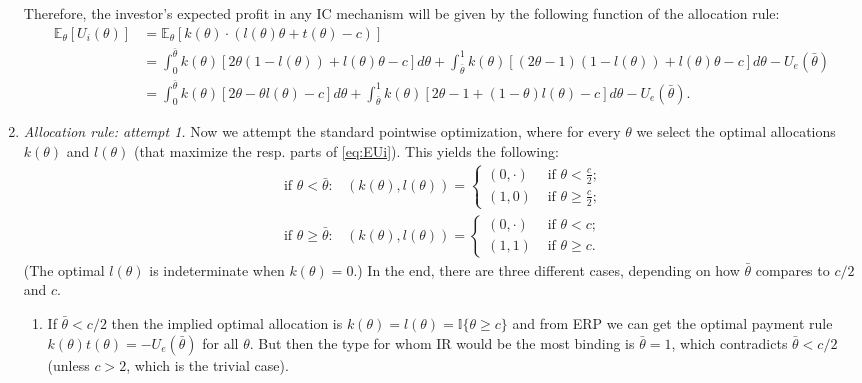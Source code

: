\documentclass[a4paper]{article}
\begin{document}
\begin{enumerate}
		Therefore, the investor's expected profit in any IC mechanism will be given by the following function of the allocation rule:
		\begin{align}
			\mathbb{E}_\theta[U_i(\theta)] &= \mathbb{E}_\theta \left[ k(\theta) \cdot (l(\theta) \theta + t(\theta) - c) \right] 
			\nonumber
			\\
			&= \int_0^{\bar{\theta}} k(\theta) \left[ 2\theta(1-l(\theta)) + l(\theta) \theta - c  \right] d\theta + \int_{\bar{\theta}}^1 k(\theta) \left[ (2\theta-1)(1-l(\theta)) + l(\theta) \theta - c  \right] d\theta - U_e(\bar{\theta})
			\nonumber
			\\
			&= \int_0^{\bar{\theta}} k(\theta) \left[ 2\theta - \theta l(\theta) - c  \right] d\theta + \int_{\bar{\theta}}^1 k(\theta) \left[ 2\theta-1 + (1-\theta) l(\theta) - c  \right] d\theta - U_e(\bar{\theta}).
			\label{eq:EUi}
		\end{align}
	
		\item \emph{Allocation rule: attempt 1.} 
		Now we attempt the standard pointwise optimization, where for every $\theta$ we select the optimal allocations $k(\theta)$ and $l(\theta)$ (that maximize the resp. parts of \eqref{eq:EUi}). This yields the following:
		\begin{align*}
			\text{ if } \theta < \bar{\theta}: & (k(\theta),l(\theta)) = 
			\begin{cases}
				(0,\cdot) & \text{ if } \theta < \frac{c}{2};
				\\
				(1,0) & \text{ if } \theta \geq \frac{c}{2};
			\end{cases}
			\\
			\text{ if } \theta \geq \bar{\theta}: & (k(\theta),l(\theta)) = 
			\begin{cases}
				(0,\cdot) & \text{ if } \theta < c;
				\\
				(1,1) & \text{ if } \theta \geq c.
			\end{cases}
		\end{align*}
		(The optimal $l(\theta)$ is indeterminate when $k(\theta)=0$.)
		In the end, there are three different cases, depending on how $\bar{\theta}$ compares to $c/2$ and $c$.
		\begin{enumerate}
			\item If $\bar{\theta} < c/2$ then the implied optimal allocation is $k(\theta)=l(\theta) = \mathbb{I}\{\theta \geq c \}$ and from ERP we can get the optimal payment rule $k(\theta)t(\theta) = -U_e(\bar{\theta})$ for all $\theta$. But then the type for whom IR would be the most binding is $\bar{\theta}=1$, which contradicts $\bar{\theta} < c/2$ (unless $c>2$, which is the trivial case).
			

\end{enumerate}
\end{enumerate}
\end{document}
